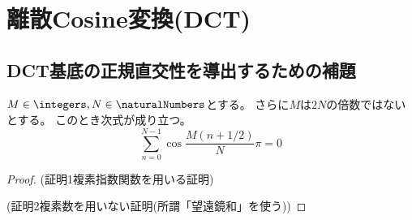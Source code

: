 \chapter{離散Cosine変換(DCT)}
    \section{DCT基底の正規直交性を導出するための補題}
        \begin{shadebox}
            $M\in\integers,N\in\naturalNumbers$とする。
            さらに$M$は$2N$の倍数ではないとする。
            このとき次式が成り立つ。
            \[ \sum_{n=0}^{N-1} \cos\frac{M(n+1/2)}{N}\pi = 0\]
        \end{shadebox}
        \begin{proof}
            (証明1複素指数関数を用いる証明)
            \par\noindent
            (証明2複素数を用いない証明(所謂「望遠鏡和」を使う))
        \end{proof}